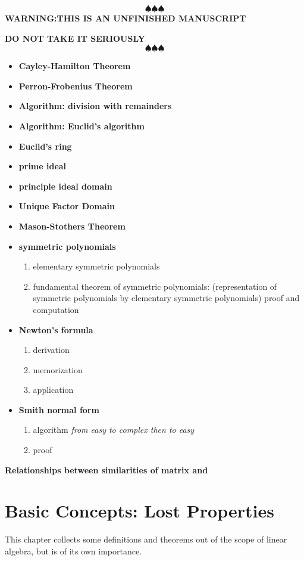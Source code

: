 \documentclass{book}
\theoremstyle{definition}
\begin{document}
\[\spadesuit\spadesuit\spadesuit\]
\textbf{WARNING:THIS IS AN UNFINISHED MANUSCRIPT}\par
\textbf{DO NOT TAKE IT SERIOUSLY}
\[\spadesuit\spadesuit\spadesuit\]
\begin{itemize}
\item \textbf{Cayley-Hamilton Theorem}
\item \textbf{Perron-Frobenius Theorem}
\item \textbf{Algorithm: division with remainders}
\item \textbf{Algorithm: Euclid's algorithm}
\item \textbf{Euclid's ring}
\item \textbf{prime ideal}
\item \textbf{principle ideal domain}
\item \textbf{Unique Factor Domain}
\item \textbf{Mason-Stothers Theorem} 
\item \textbf{symmetric polynomials}
\begin{enumerate}
    \item elementary symmetric polynomials
    \item fundamental theorem of symmetric polynomials: (representation of symmetric polynomials by elementary symmetric polynomials) proof and computation
\end{enumerate}
\item \textbf{Newton's formula} 
\begin{enumerate}
    \item derivation
    \item memorization
    \item application
\end{enumerate}
\item \textbf{Smith normal form} 
\begin{enumerate}
    \item algorithm \textit{from easy to complex then to easy}
    \item proof
\end{enumerate}
\end{itemize}
\textbf{Relationships between similarities of matrix and }
\chapter{Basic Concepts: Lost Properties}
This chapter collects some definitions and theorems out of the scope of linear algebra, but is of its own importance.
\end{document}

